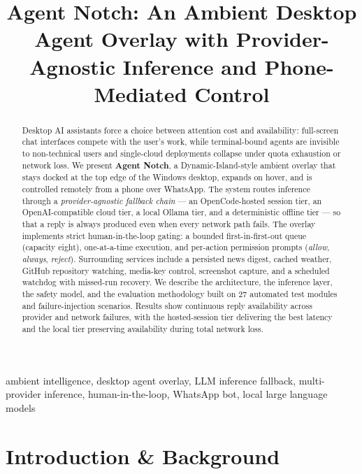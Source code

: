 \documentclass[conference]{IEEEtran}
\title{Agent Notch: An Ambient Desktop Agent Overlay with
       Provider-Agnostic Inference and Phone-Mediated Control}
\author{\IEEEauthorblockN{Project Documentation}
\IEEEauthorblockA{Personal AI Systems Research\\
Project Report}}
\begin{document}
\maketitle

\begin{abstract}
Desktop AI assistants force a choice between attention cost and
availability: full-screen chat interfaces compete with the user's
work, while terminal-bound agents are invisible to non-technical
users and single-cloud deployments collapse under quota exhaustion
or network loss. We present \textbf{Agent Notch}, a
Dynamic-Island-style ambient overlay that stays docked at the top
edge of the Windows desktop, expands on hover, and is controlled
remotely from a phone over WhatsApp. The system routes inference
through a \emph{provider-agnostic fallback chain} --- an
OpenCode-hosted session tier, an OpenAI-compatible cloud tier, a
local Ollama tier, and a deterministic offline tier --- so that a
reply is always produced even when every network path fails. The
overlay implements strict human-in-the-loop gating: a bounded
first-in-first-out queue (capacity eight), one-at-a-time
execution, and per-action permission prompts (\emph{allow},
\emph{always}, \emph{reject}). Surrounding services include a
persisted news digest, cached weather, GitHub repository
watching, media-key control, screenshot capture, and a scheduled
watchdog with missed-run recovery. We describe the architecture,
the inference layer, the safety model, and the evaluation
methodology built on 27 automated test modules and
failure-injection scenarios. Results show continuous reply
availability across provider and network failures, with the
hosted-session tier delivering the best latency and the local
tier preserving availability during total network loss.
\end{abstract}

\begin{IEEEkeywords}
ambient intelligence, desktop agent overlay, LLM inference
fallback, multi-provider inference, human-in-the-loop, WhatsApp
bot, local large language models
\end{IEEEkeywords}

\section{Introduction \& Background}
\end{document}
